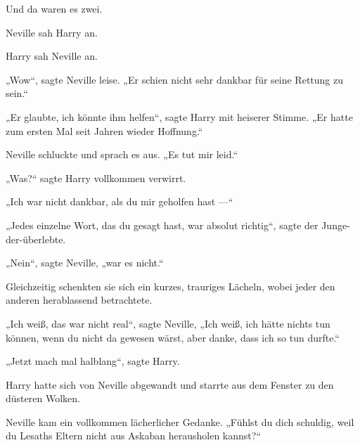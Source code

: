 Und da waren es zwei.

Neville sah Harry an.

Harry sah Neville an.

„Wow“, sagte Neville leise.
„Er schien nicht sehr dankbar für seine Rettung zu sein.“

„Er glaubte, ich könnte ihm helfen“, sagte Harry mit heiserer Stimme.
„Er hatte zum ersten Mal seit Jahren wieder Hoffnung.“

Neville schluckte und sprach es aus.
„Es tut mir leid.“

„Was?“ sagte Harry vollkommen verwirrt.

„Ich war nicht dankbar, als du mir geholfen hast —“

„Jedes einzelne Wort, das du gesagt hast, war absolut richtig“, sagte der Junge-der-überlebte.

„Nein“, sagte Neville, „war es nicht.“

Gleichzeitig schenkten sie sich ein kurzes, trauriges Lächeln, wobei jeder den anderen herablassend betrachtete.

„Ich weiß, das war nicht real“, sagte Neville,
„Ich weiß, ich hätte nichts tun können, wenn du nicht da gewesen wärst, aber danke, dass ich so tun durfte.“

„Jetzt mach mal halblang“, sagte Harry.

Harry hatte sich von Neville abgewandt und starrte aus dem Fenster zu den düsteren Wolken.

Neville kam ein vollkommen lächerlicher Gedanke.
„Fühlst du dich schuldig, weil du Lesaths Eltern nicht aus Askaban herausholen kannst?“

